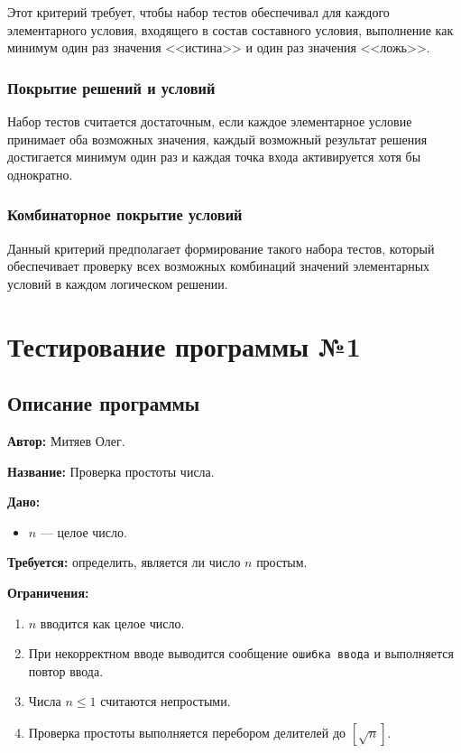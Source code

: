 \documentclass{article}[14pt]
\begin{document}
Этот критерий требует, чтобы набор тестов обеспечивал для каждого элементарного условия, входящего в состав 
составного условия, выполнение как минимум один раз значения <<истина>> и один раз значения <<ложь>>.

\subsubsection{Покрытие решений и условий}

Набор тестов считается достаточным, если каждое элементарное условие принимает оба возможных значения, каждый 
возможный результат решения достигается минимум один раз и каждая точка входа активируется хотя бы однократно.

\subsubsection{Комбинаторное покрытие условий}

Данный критерий предполагает формирование такого набора тестов, который обеспечивает проверку всех возможных 
комбинаций значений элементарных условий в каждом логическом решении.

\pagebreak

\section{Тестирование программы №1}

\subsection{Описание программы}

\noindent \textbf{Автор:} Митяев Олег.

\noindent \textbf{Название:} Проверка простоты числа.

\noindent \textbf{Дано:}

\begin{itemize}
	\item $n$ --- целое число.
\end{itemize}

\noindent \textbf{Требуется:} определить, является ли число $n$ простым.

\noindent \textbf{Ограничения:}

\begin{enumerate}
	\item $n$ вводится как целое число.
	\item При некорректном вводе выводится сообщение \texttt{ошибка ввода} и выполняется повтор ввода.
	\item Числа $n \leq 1$ считаются непростыми.
	\item Проверка простоты выполняется перебором делителей до $[\sqrt{n}]$.
\end{enumerate}
\end{document}

